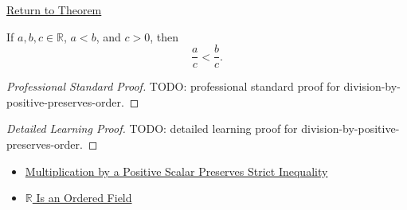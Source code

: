 \newpage
{}
\label{prf:division-by-positive-preserves-order}

\begin{remark*}[Return]
\hyperref[lem:division-by-positive-preserves-order]{Return to Theorem}
\end{remark*}

\begin{lemma*}
If $a,b,c\in\mathbb{R}$, $a<b$, and $c>0$, then
\[
\frac ac<\frac bc.
\]
\end{lemma*}

\begin{proof}[Professional Standard Proof]
\LRAProofBodyStart
TODO: professional standard proof for division-by-positive-preserves-order.
\end{proof}

\begin{proof}[Detailed Learning Proof]
\LRAProofBodyStart
TODO: detailed learning proof for division-by-positive-preserves-order.
\end{proof}

\begin{remark*}
\end{remark*}

\begin{dependencies}
\begin{itemize}
  \item \hyperref[thm:ineq-multiply-positive]{Multiplication by a Positive Scalar Preserves Strict Inequality}
  \item \hyperref[thm:r-is-an-ordered-field]{$\mathbb{R}$ Is an Ordered Field}
\end{itemize}
\end{dependencies}

\clearpage
